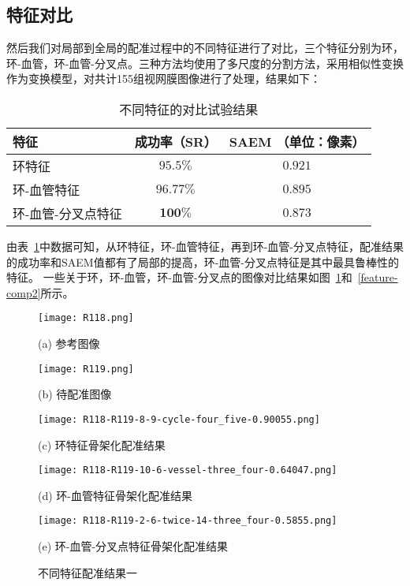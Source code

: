 \subsection{特征对比}
然后我们对局部到全局的配准过程中的不同特征进行了对比，三个特征分别为环，环-血管，环-血管-分叉点。三种方法均使用了多尺度的分割方法，采用相似性变换作为变换模型，对共计155组视网膜图像进行了处理，结果如下：
\begin{table}[!ht]
\caption{不同特征的对比试验结果}
\centering
\begin{tabular}{lcc}
\toprule
特征 & 成功率（SR）& SAEM （单位：像素）\\
\midrule
环特征 & $95.5\%$ & $0.921$ \\
环-血管特征 & $96.77\%$ & $0.895$              \\
环-血管-分叉点特征& $\mathbf{100\%}$ & $\mathbf{0.873}$\\
\bottomrule
\end{tabular}
\label{features}
\end{table}

由表~\ref{features}中数据可知，从环特征，环-血管特征，再到环-血管-分叉点特征，配准结果的成功率和SAEM值都有了局部的提高，环-血管-分叉点特征是其中最具鲁棒性的特征。
一些关于环，环-血管，环-血管-分叉点的图像对比结果如图~\ref{feature-comp1}和~\ref{feature-comp2}所示。
\begin{figure}
\centering
\begin{minipage}[b]{0.45\linewidth} 
      \centering 
      \texttt{[image: R118.png]}
        \centerline{(a) 参考图像}\medskip
\end{minipage}
  \begin{minipage}[b]{0.45\linewidth}
    \centering
    \texttt{[image: R119.png]}
      \centerline{(b) 待配准图像}\medskip
  \end{minipage}
    \begin{minipage}[b]{0.45\linewidth}
    \centering
    \texttt{[image: R118-R119-8-9-cycle-four\_five-0.90055.png]}
      \centerline{(c) 环特征骨架化配准结果}\medskip
  \end{minipage}
  \begin{minipage}[b]{0.45\linewidth}
    \centering
    \texttt{[image: R118-R119-10-6-vessel-three\_four-0.64047.png]}
      \centerline{(d) 环-血管特征骨架化配准结果}\medskip
  \end{minipage}
   \begin{minipage}[b]{0.45\linewidth}
    \centering
    \texttt{[image: R118-R119-2-6-twice-14-three\_four-0.5855.png]}
      \centerline{(e) 环-血管-分叉点特征骨架化配准结果}\medskip
  \end{minipage}
 \caption{不同特征配准结果一}
\label{feature-comp1}
\end{figure}

